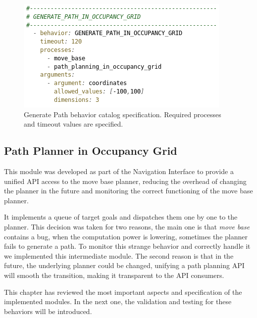  \begin{figure}
    \centering
    \includegraphics[height=0.19\textheight]{./Figures/BehaviorGPCatalog.png}
    \caption{Generate Path behavior catalog specification. Required processes and timeout values are specified.}
    \label{ch_4:fig:behav_gp_catalog}
  \end{figure}

\subsection{Path Planner in Occupancy Grid} \label{ch_4:subsect:path_planner}

  This module was developed as part of the Navigation Interface to provide a unified API access to the move base planner, reducing the overhead of changing the planner in the future and monitoring the correct functioning of the move base planner.

  It implements a queue of target goals and dispatches them one by one to the planner. This decision was taken for two reasons, the main one is that \textit{move base} contains a bug, when the computation power is lowering, sometimes the planner fails to generate a path. To monitor this strange behavior and correctly handle it we implemented this intermediate module. The second reason is that in the future, the underlying planner could be changed, unifying a path planning API will smooth the transition, making it transparent to the API consumers.

This chapter has reviewed the most important aspects and specification of the implemented modules. In the next one, the validation and testing for these behaviors will be introduced.

